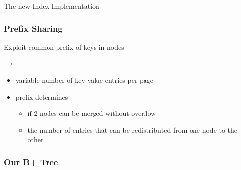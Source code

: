 \documentclass{beamer}
\begin{document}
\begin{section}{The new Index Implementation}
    \begin{frame}
      \frametitle{Prefix Sharing}
      \begin{block} {Exploit common prefix of keys in nodes}
      \pause
      $\rightarrow$
      \end{block}
      \pause
      \pause
        \begin{itemize}
            \item variable number of key-value entries per page
            \item prefix determines
            \begin{itemize}
                \item if 2 nodes can be merged without overflow
                \item the number of entries that can be redistributed from one node to the other
            \end{itemize}
        \end{itemize}    
    \end{frame}
    \begin{frame}
      \frametitle{Our B+ Tree}
      \begin{itemize}

\end{itemize}
\end{frame}
\end{section}
\end{document}
